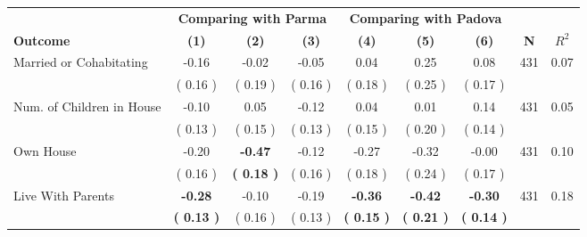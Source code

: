 \begin{tabular}{lcccccccc}
\toprule
 & \multicolumn{3}{c}{\textbf{Comparing with Parma}} & \multicolumn{3}{c}{\textbf{Comparing with Padova}} & \\
\cmidrule(lr){2-4} \cmidrule(lr){5-7} 
 \textbf{Outcome} & \textbf{(1)} & \textbf{(2)} & \textbf{(3)} & \textbf{(4)} & \textbf{(5)} & \textbf{(6)} & \textbf{N} & \textbf{$ R^2$} \\
\midrule
Married or Cohabitating &     -0.16 &     -0.02 &     -0.05 &      0.04 &      0.25 &      0.08 & 431 &       0.07 \\ 
 & (     0.16 ) & (     0.19 ) & (     0.16 ) & (     0.18 ) & (     0.25 ) & (     0.17 ) & \\
Num. of Children in House &     -0.10 &      0.05 &     -0.12 &      0.04 &      0.01 &      0.14 & 431 &       0.05 \\ 
 & (     0.13 ) & (     0.15 ) & (     0.13 ) & (     0.15 ) & (     0.20 ) & (     0.14 ) & \\
Own House &     -0.20 & \textbf{    -0.47} &     -0.12 &     -0.27 &     -0.32 &     -0.00 & 431 &       0.10 \\ 
 & (     0.16 ) & \textbf{(     0.18 )} & (     0.16 ) & (     0.18 ) & (     0.24 ) & (     0.17 ) & \\
Live With Parents & \textbf{    -0.28} &     -0.10 &     -0.19 & \textbf{    -0.36} & \textbf{    -0.42} & \textbf{    -0.30} & 431 &       0.18 \\ 
 & \textbf{(     0.13 )} & (     0.16 ) & (     0.13 ) & \textbf{(     0.15 )} & \textbf{(     0.21 )} & \textbf{(     0.14 )} & \\
\bottomrule
\end{tabular}

